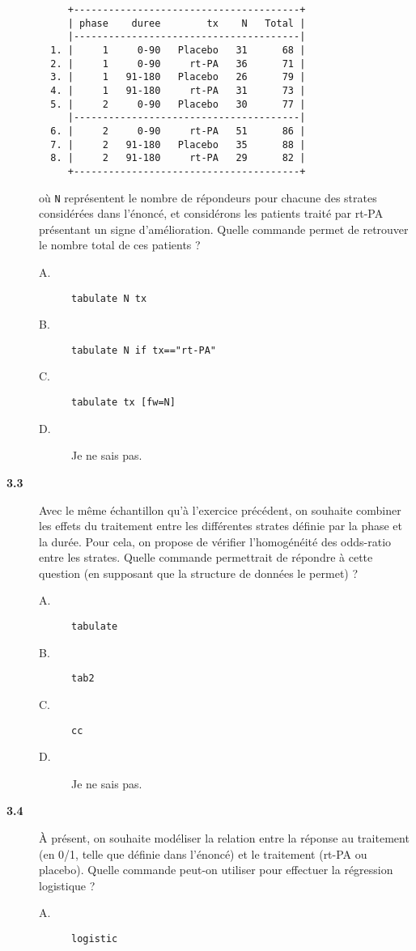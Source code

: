 \begin{description}
\begin{verbatim}
     +---------------------------------------+
     | phase    duree        tx    N   Total |
     |---------------------------------------|
  1. |     1     0-90   Placebo   31      68 |
  2. |     1     0-90     rt-PA   36      71 |
  3. |     1   91-180   Placebo   26      79 |
  4. |     1   91-180     rt-PA   31      73 |
  5. |     2     0-90   Placebo   30      77 |
     |---------------------------------------|
  6. |     2     0-90     rt-PA   51      86 |
  7. |     2   91-180   Placebo   35      88 |
  8. |     2   91-180     rt-PA   29      82 |
     +---------------------------------------+
\end{verbatim}
  où \texttt{N} représentent le nombre de répondeurs pour chacune des
  strates considérées dans l'énoncé, et considérons les patients traité par
  rt-PA présentant un signe d'amélioration. Quelle commande permet de
  retrouver le nombre total de ces patients ? 
\begin{description}
\item[A.] \verb|tabulate N tx|
\item[B.] \verb|tabulate N if tx=="rt-PA"|
\item[C.] \verb|tabulate tx [fw=N]|
\item[D.] Je ne sais pas.
\end{description}
\item[\bf 3.3] Avec le même échantillon qu'à l'exercice précédent, on
  souhaite combiner les effets du traitement entre les différentes strates
  définie par la phase et la durée. Pour cela, on propose de vérifier
  l'homogénéité des odds-ratio entre les strates. Quelle commande permettrait de
  répondre à cette question (en supposant que la structure de données le
  permet) ?  
\begin{description}
\item[A.] \verb|tabulate|
\item[B.] \verb|tab2|
\item[C.] \verb|cc|
\item[D.] Je ne sais pas.
\end{description}
\item[\bf 3.4] À présent, on souhaite modéliser la relation entre la réponse
  au traitement (en 0/1, telle que définie dans l'énoncé) et le traitement
  (rt-PA ou placebo). Quelle commande peut-on utiliser pour effectuer la
  régression logistique ? 
\begin{description}
\item[A.] \verb|logistic|

\end{description}
\end{description}
